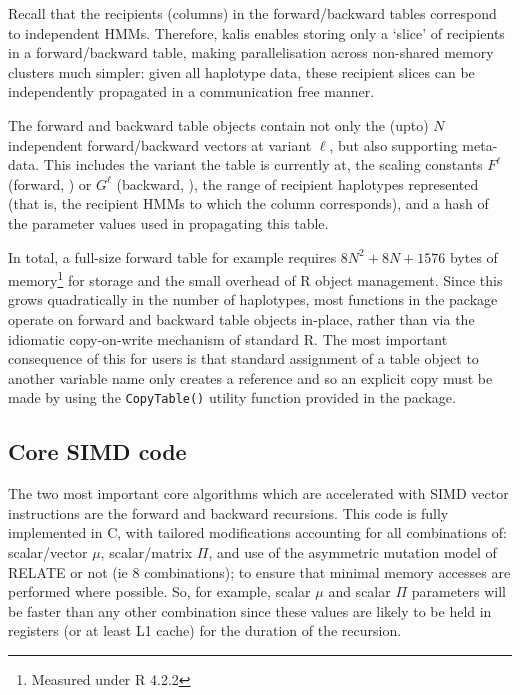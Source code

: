 \documentclass[pdflatex,referee,lineno,sn-nature]{sn-jnl}%
\let\proglang=\textsf
\newcommand{\pkg}[1]{{\fontseries{m}\fontseries{b}\selectfont #1}}
\begin{document}
Recall that the recipients (columns) in the forward/backward tables correspond to independent HMMs.
Therefore, \pkg{kalis} enables storing only a `slice' of recipients in a forward/backward table, making parallelisation across non-shared memory clusters much simpler: given all haplotype data, these recipient slices can be independently propagated in a communication free manner.

The forward and backward table objects contain not only the (upto) \(N\) independent forward/backward vectors at variant \(\ell\), but also supporting meta-data.
This includes the variant the table is currently at, the scaling constants \(F^\ell\) (forward, ) or \(G^\ell\) (backward, ), the range of recipient haplotypes represented (that is, the recipient HMMs to which the column corresponds), and a hash of the parameter values used in propagating this table.

In total, a full-size forward table for example requires \(8N^2+8N+1576\) bytes of memory\footnote{Measured under \proglang{R} 4.2.2} for storage and the small overhead of \proglang{R} object management.
Since this grows quadratically in the number of haplotypes, most functions in the package operate on forward and backward table objects in-place, rather than via the idiomatic copy-on-write mechanism of standard \proglang{R}.
The most important consequence of this for users is that standard assignment of a table object to another variable name only creates a reference and so an explicit copy must be made by using the \texttt{CopyTable()} utility function provided in the package.



\subsection*{Core SIMD code}
\label{core-simd-code}

The two most important core algorithms which are accelerated with SIMD vector instructions are the forward and backward recursions.
This code is fully implemented in \proglang{C}, with tailored modifications accounting for all combinations of: scalar/vector \(\mu\), scalar/matrix \(\Pi\), and use of the asymmetric mutation model of RELATE \cite{speidel} or not (ie 8 combinations); to ensure that minimal memory accesses are performed where possible.
So, for example, scalar \(\mu\) and scalar \(\Pi\) parameters will be faster than any other combination since these values are likely to be held in registers (or at least L1 cache) for the duration of the recursion.
\end{document}

